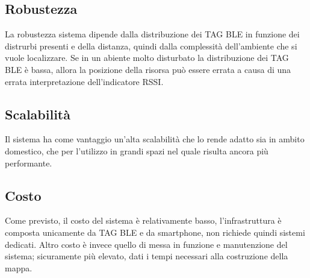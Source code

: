 \subsection{Robustezza}
La robustezza sistema dipende dalla distribuzione dei TAG BLE in funzione dei distrurbi presenti e della distanza, quindi dalla complessità dell'ambiente che si vuole localizzare. Se in un abiente molto disturbato la distribuzione dei TAG BLE è bassa, allora la posizione della risorsa può essere errata a causa di una errata interpretazione dell'indicatore RSSI.

\subsection{Scalabilità}
Il sistema ha come vantaggio un'alta scalabilità che lo rende adatto sia in ambito domestico, che per l'utilizzo in grandi spazi nel quale risulta ancora più performante.

\subsection{Costo}
Come previsto, il costo del sistema è relativamente basso, l'infrastruttura è composta unicamente da TAG BLE e da smartphone, non richiede quindi sistemi dedicati. Altro costo è invece quello di messa in funzione e manutenzione del sistema; sicuramente più elevato, dati i tempi necessari alla costruzione della mappa.